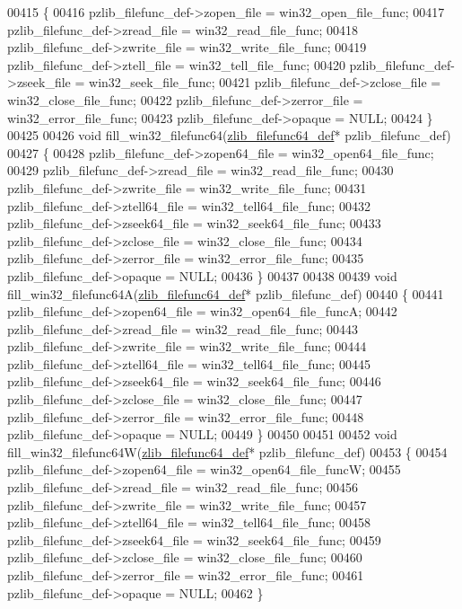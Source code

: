 \begin{DoxyCode}
00415 \{
00416     pzlib\_filefunc\_def->zopen\_file = win32\_open\_file\_func;
00417     pzlib\_filefunc\_def->zread\_file = win32\_read\_file\_func;
00418     pzlib\_filefunc\_def->zwrite\_file = win32\_write\_file\_func;
00419     pzlib\_filefunc\_def->ztell\_file = win32\_tell\_file\_func;
00420     pzlib\_filefunc\_def->zseek\_file = win32\_seek\_file\_func;
00421     pzlib\_filefunc\_def->zclose\_file = win32\_close\_file\_func;
00422     pzlib\_filefunc\_def->zerror\_file = win32\_error\_file\_func;
00423     pzlib\_filefunc\_def->opaque = NULL;
00424 \}
00425 
00426 \textcolor{keywordtype}{void} fill\_win32\_filefunc64(\hyperlink{structzlib__filefunc64__def__s}{zlib\_filefunc64\_def}* pzlib\_filefunc\_def)
00427 \{
00428     pzlib\_filefunc\_def->zopen64\_file = win32\_open64\_file\_func;
00429     pzlib\_filefunc\_def->zread\_file = win32\_read\_file\_func;
00430     pzlib\_filefunc\_def->zwrite\_file = win32\_write\_file\_func;
00431     pzlib\_filefunc\_def->ztell64\_file = win32\_tell64\_file\_func;
00432     pzlib\_filefunc\_def->zseek64\_file = win32\_seek64\_file\_func;
00433     pzlib\_filefunc\_def->zclose\_file = win32\_close\_file\_func;
00434     pzlib\_filefunc\_def->zerror\_file = win32\_error\_file\_func;
00435     pzlib\_filefunc\_def->opaque = NULL;
00436 \}
00437 
00438 
00439 \textcolor{keywordtype}{void} fill\_win32\_filefunc64A(\hyperlink{structzlib__filefunc64__def__s}{zlib\_filefunc64\_def}* pzlib\_filefunc\_def)
00440 \{
00441     pzlib\_filefunc\_def->zopen64\_file = win32\_open64\_file\_funcA;
00442     pzlib\_filefunc\_def->zread\_file = win32\_read\_file\_func;
00443     pzlib\_filefunc\_def->zwrite\_file = win32\_write\_file\_func;
00444     pzlib\_filefunc\_def->ztell64\_file = win32\_tell64\_file\_func;
00445     pzlib\_filefunc\_def->zseek64\_file = win32\_seek64\_file\_func;
00446     pzlib\_filefunc\_def->zclose\_file = win32\_close\_file\_func;
00447     pzlib\_filefunc\_def->zerror\_file = win32\_error\_file\_func;
00448     pzlib\_filefunc\_def->opaque = NULL;
00449 \}
00450 
00451 
00452 \textcolor{keywordtype}{void} fill\_win32\_filefunc64W(\hyperlink{structzlib__filefunc64__def__s}{zlib\_filefunc64\_def}* pzlib\_filefunc\_def)
00453 \{
00454     pzlib\_filefunc\_def->zopen64\_file = win32\_open64\_file\_funcW;
00455     pzlib\_filefunc\_def->zread\_file = win32\_read\_file\_func;
00456     pzlib\_filefunc\_def->zwrite\_file = win32\_write\_file\_func;
00457     pzlib\_filefunc\_def->ztell64\_file = win32\_tell64\_file\_func;
00458     pzlib\_filefunc\_def->zseek64\_file = win32\_seek64\_file\_func;
00459     pzlib\_filefunc\_def->zclose\_file = win32\_close\_file\_func;
00460     pzlib\_filefunc\_def->zerror\_file = win32\_error\_file\_func;
00461     pzlib\_filefunc\_def->opaque = NULL;
00462 \}
\end{DoxyCode}

